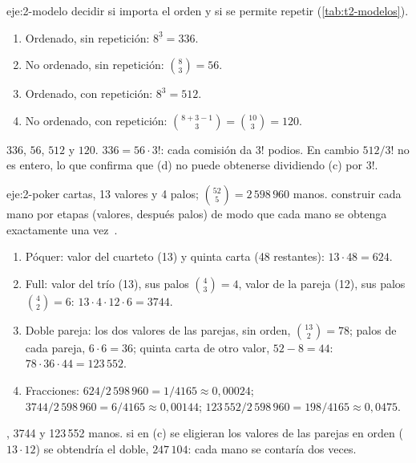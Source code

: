 \begin{solucion}{eje:2-modelo}
\planteamiento decidir si importa el orden y si se permite repetir (\cref{tab:t2-modelos}).
\pasos
\begin{enumerate}[label=(\alph*)]
  \item Ordenado, sin repetición: $8^{\underline3}=336$.
  \item No ordenado, sin repetición: $\binom83=56$.
  \item Ordenado, con repetición: $8^{3}=512$.
  \item No ordenado, con repetición: $\binom{8+3-1}{3}=\binom{10}{3}=120$.
\end{enumerate}
\resultado $336$, $56$, $512$ y $120$.
\comprobacion $336=56\cdot3!$: cada comisión da $3!$ podios. En cambio $512/3!$ no es entero, lo que confirma que (d) no puede obtenerse dividiendo (c) por $3!$.
\end{solucion}

\begin{solucion}{eje:2-poker}
 cartas, 13 valores y 4 palos; $\binom{52}5=2\,598\,960$ manos.
\planteamiento construir cada mano por etapas (valores, después palos) de modo que cada mano se obtenga exactamente una vez~\cite[§14.7]{mcs}.
\pasos
\begin{enumerate}[label=(\alph*)]
  \item Póquer: valor del cuarteto (13) y quinta carta (48 restantes): $13\cdot48=624$.
  \item Full: valor del trío (13), sus palos $\binom43=4$, valor de la pareja (12), sus palos $\binom42=6$: $13\cdot4\cdot12\cdot6=3744$.
  \item Doble pareja: los dos valores de las parejas, sin orden, $\binom{13}{2}=78$; palos de cada pareja, $6\cdot6=36$; quinta carta de otro valor, $52-8=44$: $78\cdot36\cdot44=123\,552$.
  \item Fracciones: $624/2\,598\,960=1/4165\approx0{,}00024$; $3744/2\,598\,960=6/4165\approx0{,}00144$; $123\,552/2\,598\,960=198/4165\approx0{,}0475$.
\end{enumerate}
, 3744 y 123\,552 manos.
\comprobacion si en (c) se eligieran los valores de las parejas en orden ($13\cdot12$) se obtendría el doble, $247\,104$: cada mano se contaría dos veces.
\end{solucion}


